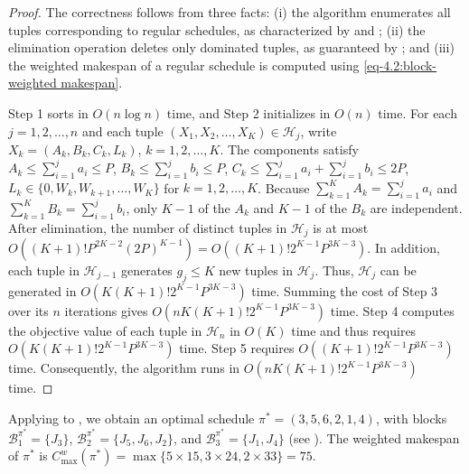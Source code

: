 ﻿\documentclass[12pt]{article} \textheight=24.5cm \textwidth=16.5cm \parskip = 0.165cm
\begin{document}
\begin{sloppypar}
        \begin{proof}
        The correctness follows from three facts: (i) the algorithm enumerates all tuples corresponding to regular schedules, as  characterized by  and ; (ii) the elimination operation deletes only dominated tuples, as guaranteed by ; and (iii) the weighted makespan of a regular schedule is computed using \cref{eq-4.2:block-weighted makespan}.

        Step 1 sorts in $O(n\log n)$ time, and Step 2 initializes in $O(n)$ time.
        For each $j=1, 2, \ldots, n$ and each tuple $(X_1, X_2, \ldots, X_K) \in \mathcal{H}_j$, write $X_k=(A_k, B_k, C_k, L_k)$, $k=1, 2, \ldots, K$.
        The components satisfy $A_k \leq \sum_{i=1}^{j} a_i \leq P$, $B_k \leq \sum_{i=1}^{j} b_i \leq P$, $C_k \leq \sum_{i=1}^{j} a_i +\sum_{i=1}^{j} b_i \leq 2P$, $L_k \in \{0, W_k, W_{k+1}, \ldots, W_K\}$ for $k=1, 2, \ldots, K$.
        Because $\sum_{k=1}^K A_k=\sum_{i=1}^j a_i$ and $\sum_{k=1}^K B_k=\sum_{i=1}^j b_i$, only $K-1$ of the $A_k$ and $K-1$ of the $B_k$ are independent.
        After elimination, the number of distinct tuples in $\mathcal{H}_j$ is at most $O((K+1)! P^{2K-2} (2P)^{K-1})=O((K+1)! 2^{K-1} P^{3K-3})$.
        In addition, each tuple in $\mathcal{H}_{j-1}$ generates $g_j \leq K$ new tuples in $\mathcal{H}_j$.
        Thus, $\mathcal{H}_j$ can be generated in $O(K(K+1)! 2^{K-1} P^{3K-3})$ time.
        Summing the cost of Step 3 over its $n$ iterations gives $O(n K (K+1)! 2^{K-1} P^{3K-3})$ time.
        Step 4 computes the objective value of each tuple in $\mathcal{H}_n$ in $O(K)$ time and thus requires $O(K (K+1)! 2^{K-1} P^{3K-3})$ time.
        Step 5 requires $O((K+1)! 2^{K-1} P^{3K-3})$ time.
        Consequently, the algorithm runs in $O(n K (K+1)! 2^{K-1} P^{3K-3})$ time.
        \end{proof}

        Applying  to , we obtain an optimal schedule $\pi^*=(3, 5, 6, 2, 1, 4)$, with blocks $\mathcal{B}_1^{\pi^*}=\{J_3\}$, $\mathcal{B}_2^{\pi^*}=\{J_5,J_6, J_2\}$, and $\mathcal{B}_3^{\pi^*}=\{J_1, J_4\}$ (see ).
        The weighted makespan of $\pi^*$ is $C_{\max}^w(\pi^*)=\max \{5 \times 15, 3 \times 24, 2 \times 33\}=75$.

        \begin{figure}[H]
            \centering
\end{figure}
\end{sloppypar}
\end{document}
